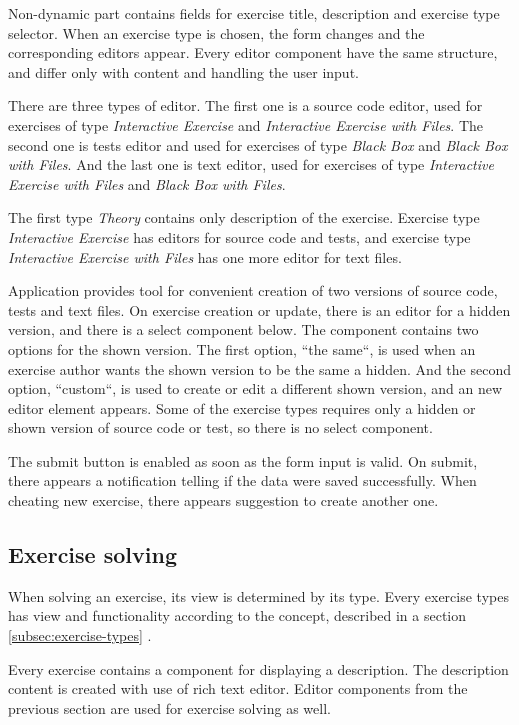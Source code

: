         Non-dynamic part contains fields for exercise title, description and exercise type selector. When an exercise type is chosen, the form changes and the corresponding editors appear. Every editor component have the same structure, and differ only with content and handling the user input.
        
        There are three types of editor. The first one is a source code editor, used for exercises of type \textit{Interactive Exercise} and \textit{Interactive Exercise with Files}. The second one is tests editor and used for exercises of type \textit{Black Box} and \textit{Black Box with Files}. And the last one is text editor, used for exercises of type \textit{Interactive Exercise with Files} and \textit{Black Box with Files}.
        
        The first type \textit{Theory} contains only description of the exercise. Exercise type \textit{Interactive Exercise} has editors for source code and tests, and exercise type \textit{Interactive Exercise with Files} has one more editor for text files.
        
        Application provides tool for convenient creation of two versions of source code, tests and text files. On exercise creation or update, there is an editor for a hidden version, and there is a select component below. The component contains two options for the shown version. The first option, ``the same``, is used when an exercise author wants the shown version to be the same a hidden. And the second option, ``custom``, is used to create or edit a different shown version, and an new editor element appears. Some of the exercise types requires only a hidden or shown version of source code or test, so there is no select component.
        
        The submit button is enabled as soon as the form input is valid. On submit, there appears a notification telling if the data were saved successfully. When cheating new exercise, there appears suggestion to create another one.
        
        \subsection{Exercise solving}
        When solving an exercise, its view is determined by its type. Every exercise types has view and functionality according to the concept, described in a section \ref{subsec:exercise-types} .
        
        Every exercise contains a component for displaying a description. The description content is created with use of rich text editor. Editor components from the previous section are used for exercise solving as well.
        

